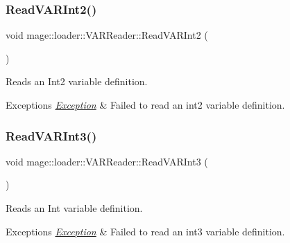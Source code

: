\subsubsection{\texorpdfstring{Read\+V\+A\+R\+Int2()}{ReadVARInt2()}}
{\footnotesize\ttfamily void mage\+::loader\+::\+V\+A\+R\+Reader\+::\+Read\+V\+A\+R\+Int2 (\begin{DoxyParamCaption}{ }\end{DoxyParamCaption})\hspace{0.3cm}{\ttfamily [private]}}

Reads an Int2 variable definition.


\begin{DoxyExceptions}{Exceptions}
{\em \mbox{\hyperlink{classmage_1_1_exception}{Exception}}} & Failed to read an int2 variable definition. \\
\hline
\end{DoxyExceptions}
\mbox{\label{classmage_1_1loader_1_1_v_a_r_reader_a519dd541a8ee90bc83505d80e5dc1f49}} 
\subsubsection{\texorpdfstring{Read\+V\+A\+R\+Int3()}{ReadVARInt3()}}
{\footnotesize\ttfamily void mage\+::loader\+::\+V\+A\+R\+Reader\+::\+Read\+V\+A\+R\+Int3 (\begin{DoxyParamCaption}{ }\end{DoxyParamCaption})\hspace{0.3cm}{\ttfamily [private]}}

Reads an Int variable definition.


\begin{DoxyExceptions}{Exceptions}
{\em \mbox{\hyperlink{classmage_1_1_exception}{Exception}}} & Failed to read an int3 variable definition. \\
\hline
\end{DoxyExceptions}
\mbox{\label{classmage_1_1loader_1_1_v_a_r_reader_a4ccc6a48ca72707853ff910362318940}} 
